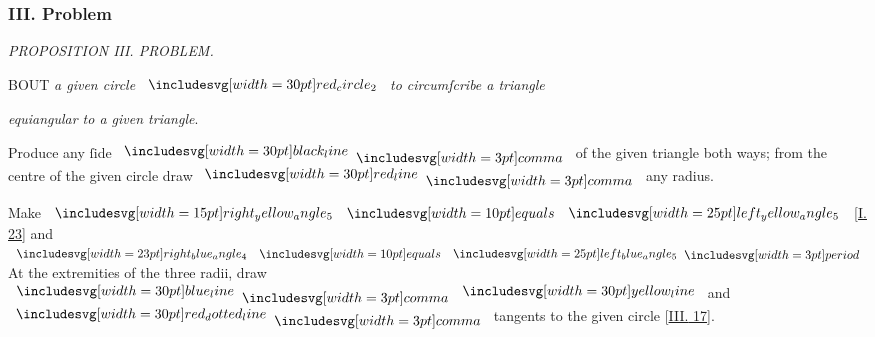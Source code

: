 \documentclass[11pt,preview]{standalone}
\begin{document}
\subsubsection{III. Problem}

\begin{minipage}[t]{0.54\textwidth}
  \begin{center}
    \textit{PROPOSITION III. PROBLEM.}\label{book4pr3} \\
  \end{center}

  \hfill

  \begin{center}
    \raggedright \lettrine[lines=3, loversize=1, nindent=0pt]{}{}BOUT \textit{a given circle} $\img[0][0][30]{red_circle_2}$ \textit{to circumſcribe a triangle}
  \end{center}
  \vspace{1ex}
  \textit{equiangular to a given triangle}.
\end{minipage}%
\hfill
\begin{minipage}[t]{0.43\textwidth}
  \vspace{20pt}
  
\end{minipage}%

\hfill

\hfill

Produce any ſide $\blackline \bcomma$ of the given triangle both ways; from the centre of the given circle draw $\redline \bcomma$ any radius.

\hfill

\begin{center}
  Make $\img[0][0][15]{right_yellow_angle_5} \bequals \img{left_yellow_angle_5}$ [\hyperref[book1pr23]{\textsc{I.} 23}] and $\img[0][0][23]{right_blue_angle_4} \bequals \img{left_blue_angle_5} \bperiod$\\
  At the extremities of the three radii, draw $\blueline \bcomma \yellowline$ and\\
  $\dottedredline \bcomma$ tangents to the given circle [\hyperref[book3pr17]{\textsc{III.} 17}].
\end{center}

\hfill
\end{document}
